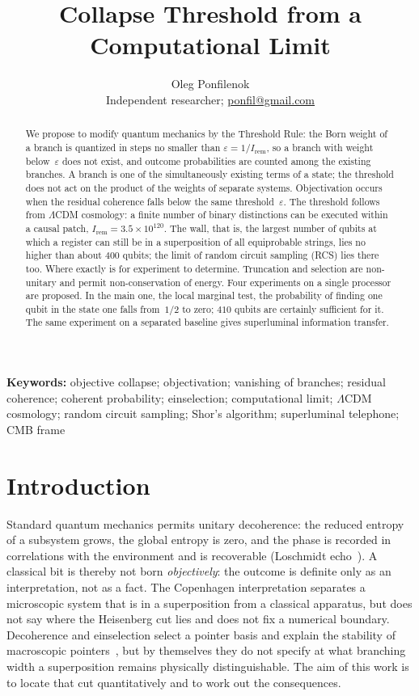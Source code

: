 \documentclass[11pt,a4paper]{article}
\title{\textbf{Collapse Threshold from a Computational Limit}}
\author{%
  Oleg Ponfilenok\\[0.35em]%
  {\normalsize Independent researcher; \href{mailto:ponfil@gmail.com}{ponfil@gmail.com}}%
}
\date{}
\newcommand{\Ost}{I_{\mathrm{rem}}}
\newcommand{\CollapseRule}{Threshold Rule}
\begin{document}
\maketitle

\begin{abstract}
We propose to modify quantum mechanics by the \CollapseRule{}: the Born weight of a branch is quantized in steps no smaller than $\varepsilon=1/\Ost$, so a branch with weight below~$\varepsilon$ does not exist, and outcome probabilities are counted among the existing branches. A branch is one of the simultaneously existing terms of a state; the threshold does not act on the product of the weights of separate systems. Objectivation occurs when the residual coherence falls below the same threshold~$\varepsilon$. The threshold follows from $\Lambda$CDM cosmology: a finite number of binary distinctions can be executed within a causal patch, $\Ost=3.5\times 10^{120}$. The wall, that is, the largest number of qubits at which a register can still be in a superposition of all equiprobable strings, lies no higher than about $400$ qubits; the limit of random circuit sampling (RCS) lies there too. Where exactly is for experiment to determine. Truncation and selection are non-unitary and permit non-conservation of energy. Four experiments on a single processor are proposed. In the main one, the local marginal test, the probability of finding one qubit in the state one falls from~$1/2$ to zero; $410$ qubits are certainly sufficient for it. The same experiment on a separated baseline gives superluminal information transfer.
\end{abstract}

\noindent\textbf{Keywords:} objective collapse; objectivation; vanishing of branches; residual coherence; coherent probability; einselection; computational limit; $\Lambda$CDM cosmology; random circuit sampling; Shor's algorithm; superluminal telephone; CMB frame

\vspace{1em}

\section{Introduction}

Standard quantum mechanics permits unitary decoherence: the reduced entropy of a subsystem grows, the global entropy is zero, and the phase is recorded in correlations with the environment and is recoverable (Loschmidt echo~\cite{swingle2018}). A classical bit is thereby not born \emph{objectively}: the outcome is definite only as an interpretation, not as a fact. The Copenhagen interpretation separates a microscopic system that is in a superposition from a classical apparatus, but does not say where the Heisenberg cut lies and does not fix a numerical boundary. Decoherence and einselection select a pointer basis and explain the stability of macroscopic pointers~\cite{zurek2003}, but by themselves they do not specify at what branching width a superposition remains physically distinguishable. The aim of this work is to locate that cut quantitatively and to work out the consequences.
\end{document}
